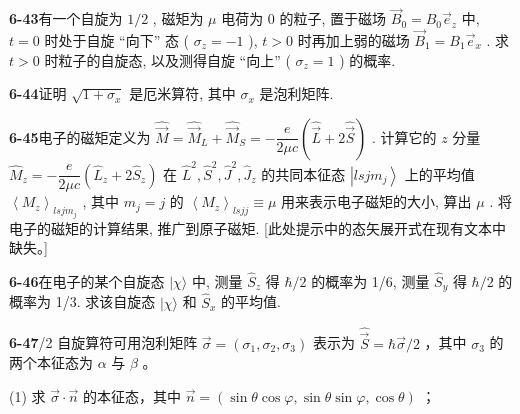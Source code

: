 \vfill

\newpage

\textbf{6-43}\quad 有一个自旋为 $\displaystyle 1/2$ , 磁矩为 $\displaystyle \mu$ 电荷为 0 的粒子, 置于磁场 $\displaystyle \vec{B}_0 = B_0\vec{e}_z$ 中, $\displaystyle t = 0$ 时处于自旋 “向下” 态 ( $\displaystyle \sigma_z = -1$ ), $\displaystyle t > 0$ 时再加上弱的磁场 $\displaystyle \vec{B}_1 = B_1\vec{e}_x$ . 求 $\displaystyle t > 0$ 时粒子的自旋态, 以及测得自旋 “向上” ( $\displaystyle \sigma_z = 1$ ) 的概率.

\vfill

\newpage

\textbf{6-44}\quad 证明 $\displaystyle \sqrt{1 + \sigma_x}$ 是厄米算符, 其中 $\displaystyle \sigma_x$ 是泡利矩阵.

\vfill

\newpage

\textbf{6-45}\quad 电子的磁矩定义为 $\displaystyle \hat{\vec{M}} = \hat{\vec{M}}_L + \hat{\vec{M}}_S = -\dfrac{e}{2\mu c}\left(\hat{\vec{L}} + 2\hat{\vec{S}}\right)$ . 计算它的 $\displaystyle z$ 分量 $\displaystyle \hat{M}_z = -\dfrac{e}{2\mu c}\left(\hat{L}_z + 2\hat{S}_z\right)$ 在 $\displaystyle \hat{L}^2, \hat{S}^2, \hat{J}^2, \hat{J}_z$ 的共同本征态 $\displaystyle \left|lsjm_j\right\rangle$ 上的平均值 $\displaystyle \left\langle M_z\right\rangle_{lsjm_j}$ , 其中 $\displaystyle m_j = j$ 的 $\displaystyle \left\langle M_z\right\rangle_{lsjj} \equiv \mu$ 用来表示电子磁矩的大小, 算出 $\displaystyle \mu$ . 将电子的磁矩的计算结果, 推广到原子磁矩. [此处提示中的态矢展开式在现有文本中缺失。]

\vfill

\newpage

\textbf{6-46}\quad 在电子的某个自旋态 $\displaystyle |\chi\rangle$ 中, 测量 $\displaystyle \hat{S}_z$ 得 $\displaystyle \hbar / 2$ 的概率为 1/6, 测量 $\displaystyle \hat{S}_y$ 得 $\displaystyle \hbar / 2$ 的概率为 1/3. 求该自旋态 $\displaystyle |\chi\rangle$ 和 $\displaystyle \hat{S}_x$ 的平均值.

\vfill

\newpage

\textbf{6-47}/2 自旋算符可用泡利矩阵 $\displaystyle \vec{\sigma} = (\sigma_1, \sigma_2, \sigma_3)$ 表示为 $\displaystyle \hat{\vec{S}} = \hbar \vec{\sigma} / 2$ ，其中 $\displaystyle \sigma_3$ 的两个本征态为 $\displaystyle \alpha$ 与 $\displaystyle \beta$ 。

(1) 求 $\displaystyle \vec{\sigma} \cdot \vec{n}$ 的本征态，其中 $\displaystyle \vec{n} = (\sin \theta \cos \varphi, \sin \theta \sin \varphi, \cos \theta)$ ；

